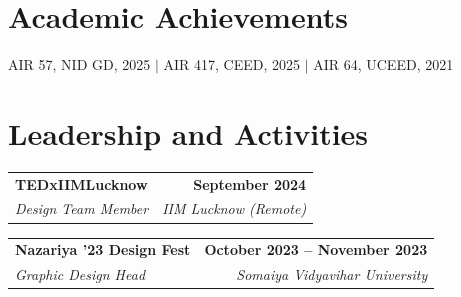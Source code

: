 \documentclass[a4paper,10.5pt]{article}
\makeatletter
\newcommand{\resumeEntry}[4]{
    \begin{tabularx}{\textwidth}{@{}X r@{}}
        \textbf{\color{headingcolor}#1} & \textbf{#4} \\
        \textit{#3} & \textit{#2}
    \end{tabularx}
    \vspace{1pt}
}
\makeatother
\begin{document}
\section{Academic Achievements}

AIR 57, NID GD, 2025
\enspace $\vert$ \enspace
AIR 417, CEED, 2025
\enspace $\vert$ \enspace
AIR 64, UCEED, 2021

\section{Leadership and Activities}

\resumeEntry
    {TEDxIIMLucknow}
    {IIM Lucknow (Remote)}
    {Design Team Member}
    {September 2024}

\vspace{5pt}

\resumeEntry
    {Nazariya '23 Design Fest}
    {Somaiya Vidyavihar University}
    {Graphic Design Head}
    {October 2023 -- November 2023}
\end{document}
